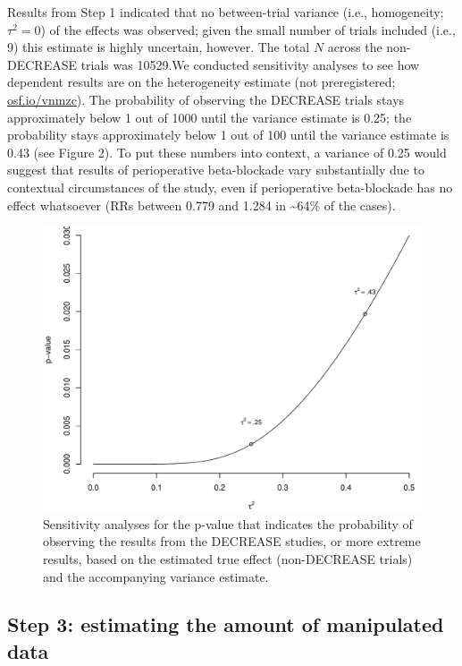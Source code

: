\documentclass[]{article}
\begin{document}
Results from Step 1 indicated that no between-trial variance (i.e.,
homogeneity; \(\tau^2=0\)) of the effects was observed; given the small
number of trials included (i.e., 9) this estimate is highly uncertain,
however. The total \(N\) across the non-DECREASE trials was 10529.We
conducted sensitivity analyses to see how dependent results are on the
heterogeneity estimate (not preregistered;
\href{https://osf.io/vnmzc}{osf.io/vnmzc}). The probability of observing
the DECREASE trials stays approximately below 1 out of 1000 until the
variance estimate is 0.25; the probability stays approximately below 1
out of 100 until the variance estimate is 0.43 (see Figure 2). To put
these numbers into context, a variance of 0.25 would suggest that
results of perioperative beta-blockade vary substantially due to
contextual circumstances of the study, even if perioperative
beta-blockade has no effect whatsoever (RRs between 0.779 and 1.284 in
\textasciitilde{}64\% of the cases).

\begin{figure}

{\centering \includegraphics[width=0.8\linewidth]{../figures/fig2} 

}

\caption{Sensitivity analyses for the p-value that indicates the probability of observing the results from the DECREASE studies, or more extreme results, based on the estimated true effect (non-DECREASE trials) and the accompanying variance estimate.}\label{fig:figure 2}
\end{figure}

\subsection{Step 3: estimating the amount of manipulated
data}\label{step-3-estimating-the-amount-of-manipulated-data}
\end{document}
